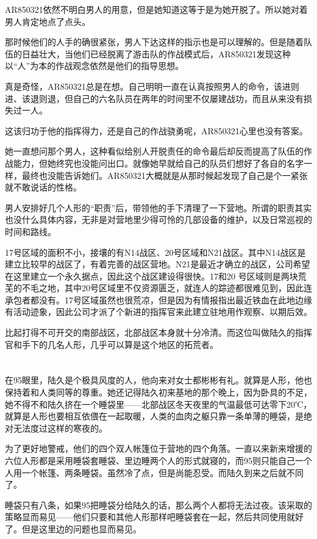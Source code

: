 AR850321依然不明白男人的用意，但是她知道这等于是为她开脱了。所以她对着男人肯定地点了点头。

那时候他们的人手的确很紧张，男人下达这样的指示也是可以理解的。但是随着队伍的日益壮大，当他们已经脱离了游击队的作战模式后，AR850321发现这种以“人”为本的作战观念依然是他们的指导思想。

真是奇怪，AR850321总是在想。自己明明一直在认真按照男人的命令，该进则进、该退则退，但自己的六名队员在两年的时间里不仅屡建战功，而且从来没有损失过一人。

这该归功于他的指挥得力，还是自己的作战骁勇呢，AR850321心里也没有答案。

她一直想问那个男人，这种看似给别人开脱责任的命令最后却反而提高了队伍的作战能力，但她终究也没能问出口。就像她早就给自己的队员们想好了各自的名字一样，最终也没能告诉她们。AR850321大概就是从那时候起发现了自己是个一紧张就不敢说话的性格。

男人安排好几个人形的“职责”后，带领他的手下清理了一下营地。所谓的职责其实也没什么具体内容，无非是对营地里少得可怜的几部设备的维护，以及日常巡视的时间和路线。

17号区域的面积不小，接壤的有N14战区、20号区域和N21战区。其中N14战区是建立比较早的战区了，有着完善的战区营地。N21是最近才确立的战区，公司希望在这里建立一个永久据点，因此这个战区建设得很快。17和20 号区域则是两块荒芜的不毛之地，其中20号区域里不仅资源匮乏，就连人的踪迹都很难见到，因此连承包者都没有。17号区域虽然也很荒凉，但是因为有情报指出最近铁血在此地边缘有活动迹象，因此公司才派了个新进的指挥官来此建立驻地用作观察、以期后效。

比起打得不可开交的南部战区，北部战区本身就十分冷清。而这位叫做陆久的指挥官和手下的几名人形，几乎可以算是这个地区的拓荒者。

\section*{}

在95眼里，陆久是个极具风度的人，他向来对女士都彬彬有礼。就算是人形，他也保持着和人类同等的尊重。她还记得陆久初来基地的那个晚上，因为卧具的不足，她不得不和陆久挤在一个睡袋里——北部战区冬天夜里的气温最低可达零下20℃，就算是人形也要相互依偎在一起取暖，人类的血肉之躯只靠一条单薄的睡袋，是绝对无法度过这样的寒夜的。

为了更好地警戒，他们的四个双人帐篷位于营地的四个角落。一直以来新来增援的六位人形都是采用睡袋套睡袋、里边睡两个人的形式就寝的，而95则只能自己一个人用一个帐篷、两条睡袋。虽然冷了点，但是尚能忍受。而陆久到来之后就不同了。

睡袋只有八条，如果95把睡袋分给陆久的话，那么两个人都将无法过夜。该采取的策略显而易见——他们只要和其他人形那样吧睡袋套在一起，然后共同使用就好了。但是这里边的问题也显而易见。

